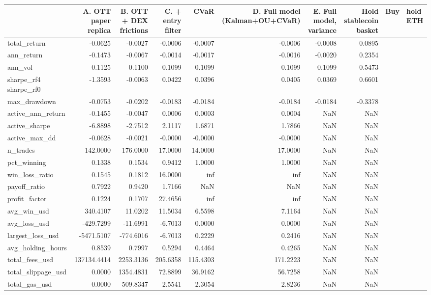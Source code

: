 \begin{tabular}{lrrrrrrr}
\toprule
 & A. OTT paper replica & B. OTT + DEX frictions & C. + entry filter & CVaR & D. Full model (Kalman+OU+CVaR) & E. Full model, variance & Hold stablecoin basket & Buy & hold ETH \\
\midrule
total_return & -0.0625 & -0.0027 & -0.0006 & -0.0007 & -0.0006 & -0.0008 & 0.0895 \\
ann_return & -0.1473 & -0.0067 & -0.0014 & -0.0017 & -0.0016 & -0.0020 & 0.2354 \\
ann_vol & 0.1125 & 0.1100 & 0.1099 & 0.1099 & 0.1099 & 0.1099 & 0.5473 \\
sharpe_rf4%
sharpe_rf0 & -1.3593 & -0.0063 & 0.0422 & 0.0396 & 0.0405 & 0.0369 & 0.6601 \\
max_drawdown & -0.0753 & -0.0202 & -0.0183 & -0.0184 & -0.0184 & -0.0184 & -0.3378 \\
active_ann_return & -0.1455 & -0.0047 & 0.0006 & 0.0003 & 0.0004 & NaN & NaN \\
active_sharpe & -6.8898 & -2.7512 & 2.1117 & 1.6871 & 1.7866 & NaN & NaN \\
active_max_dd & -0.0628 & -0.0021 & -0.0000 & -0.0000 & -0.0000 & NaN & NaN \\
n_trades & 142.0000 & 176.0000 & 17.0000 & 14.0000 & 17.0000 & NaN & NaN \\
pct_winning & 0.1338 & 0.1534 & 0.9412 & 1.0000 & 1.0000 & NaN & NaN \\
win_loss_ratio & 0.1545 & 0.1812 & 16.0000 & inf & inf & NaN & NaN \\
payoff_ratio & 0.7922 & 0.9420 & 1.7166 & NaN & NaN & NaN & NaN \\
profit_factor & 0.1224 & 0.1707 & 27.4656 & inf & inf & NaN & NaN \\
avg_win_usd & 340.4107 & 11.0202 & 11.5034 & 6.5598 & 7.1164 & NaN & NaN \\
avg_loss_usd & -429.7299 & -11.6991 & -6.7013 & 0.0000 & 0.0000 & NaN & NaN \\
largest_loss_usd & -5471.5107 & -774.6016 & -6.7013 & 0.2229 & 0.2416 & NaN & NaN \\
avg_holding_hours & 0.8539 & 0.7997 & 0.5294 & 0.4464 & 0.4265 & NaN & NaN \\
total_fees_usd & 137134.4414 & 2253.3136 & 205.6358 & 115.4303 & 171.2223 & NaN & NaN \\
total_slippage_usd & 0.0000 & 1354.4831 & 72.8899 & 36.9162 & 56.7258 & NaN & NaN \\
total_gas_usd & 0.0000 & 509.8347 & 2.5541 & 2.3054 & 2.8236 & NaN & NaN \\
\bottomrule
\end{tabular}
